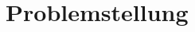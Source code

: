 
\chapter{Problemstellung}
\label{chapter:problemstellung}



\begin{otherlanguage}{american}







\end{otherlanguage}



